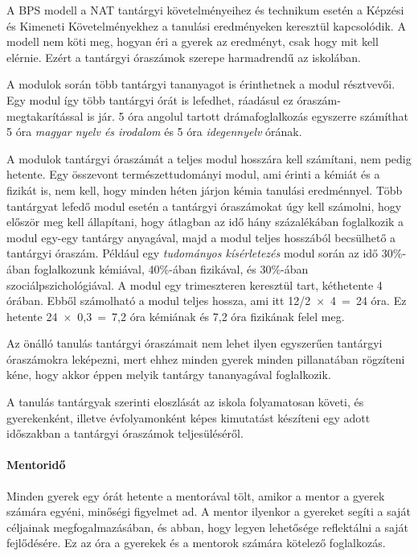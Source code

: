 A BPS modell a NAT tantárgyi követelményeihez és technikum esetén a
Képzési és Kimeneti Követelményekhez a tanulási eredményeken keresztül
kapcsolódik. A modell nem köti meg, hogyan éri a gyerek az eredményt,
csak hogy mit kell elérnie. Ezért a tantárgyi óraszámok szerepe
harmadrendű az iskolában.

A modulok során több tantárgyi tananyagot is érinthetnek a modul
résztvevői. Egy modul így több tantárgyi órát is lefedhet, ráadásul ez
óra\-szám-meg\-takarítással is jár. 5 óra angolul tartott drámafoglalkozás
egyszerre számíthat 5 óra \emph{magyar nyelv és irodalom} és 5 óra
\emph{idegennyelv} órának.

A modulok tantárgyi óraszámát a teljes modul hosszára kell számítani, nem
pedig hetente. Egy összevont természettudományi modul, ami érinti a kémiát
és a fizikát is, nem kell, hogy minden héten járjon kémia tanulási
eredménnyel. Több tantárgyat lefedő modul esetén a tantárgyi óraszámokat
úgy kell számolni, hogy először meg kell állapítani, hogy átlagban az
idő hány százalékában foglalkozik a modul egy-egy tantárgy anyagával,
majd a modul teljes hosszából becsülhető a tantárgyi óraszám. Például
egy \emph{tudományos kísérletezés} modul során az idő 30\%-ában
foglalkozunk kémiával, 40\%-ában fizikával, és 30\%-ában
szociálpszichológiával. A modul egy trimeszteren keresztül tart,
kéthetente 4 órában. Ebből számolható a modul teljes hossza, ami itt
12/2~$\times$~4~=~24 óra. Ez hetente 24~$\times$~0,3~=~7,2 óra kémiának és 7,2 óra
fizikának felel meg.

Az önálló tanulás tantárgyi óraszámait nem lehet ilyen egyszerűen
tantárgyi óraszámokra leképezni, mert ehhez minden gyerek minden
pillanatában rögzíteni kéne, hogy akkor éppen melyik tantárgy tananyagával
foglalkozik.

A tanulás tantárgyak szerinti eloszlását az iskola folyamatosan követi,
és gyerekenként, illetve évfolyamonként képes kimutatást készíteni egy
adott időszakban a tantárgyi óraszámok teljesüléséről.

\hypertarget{tantargyakMentorido}{%
\paragraph{Mentoridő}\label{tantargyakMentorido}}

Minden gyerek egy órát hetente a mentorával tölt, amikor a mentor a
gyerek számára egyéni, minőségi figyelmet ad. A mentor ilyenkor a
gyereket segíti a saját céljainak megfogalmazásában, és abban, hogy legyen
lehetősége reflektálni a saját fejlődésére. Ez az óra a gyerekek és a
mentorok számára kötelező foglalkozás.

